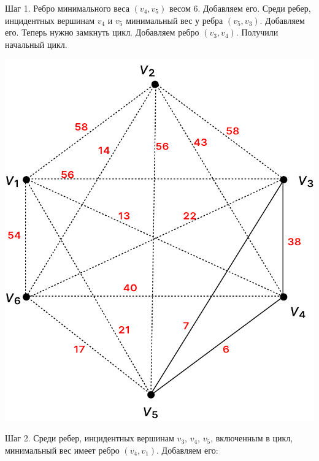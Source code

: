 \documentclass[12pt]{article}
\begin{document}
Шаг 1. Ребро минимального веса $(v_4, v_5)$ весом 6. Добавляем его. Среди
ребер, инцидентных вершинам $v_4$ и $v_5$  минимальный вес у ребра $(v_5, v_3)$.
Добавляем его. Теперь нужно замкнуть цикл. Добавляем ребро $(v_3, v_4)$.
Получили начальный цикл.

\begin{center}
\includegraphics[scale=.6]{19_2.pdf}
\end{center}

Шаг 2. Среди ребер, инцидентных вершинам $v_3$, $v_4$, $v_5$, включенным в цикл,
минимальный вес имеет ребро $(v_4, v_1)$. Добавляем его:
\end{document}
